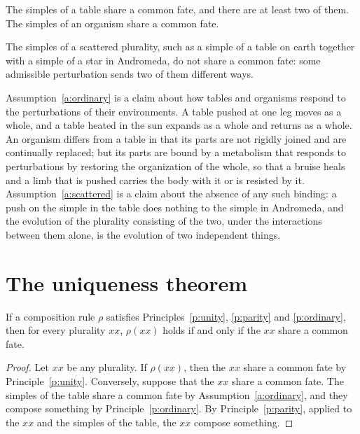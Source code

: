 \documentclass{situationist-preprint}
\begin{document}
\begin{assumption}\label{a:ordinary}
The simples of a table share a common fate, and there are at least two of them. The simples of an organism share a common fate.
\end{assumption}

\begin{assumption}\label{a:scattered}
The simples of a scattered plurality, such as a simple of a table on earth together with a simple of a star in Andromeda, do not share a common fate: some admissible perturbation sends two of them different ways.
\end{assumption}

Assumption~\ref{a:ordinary} is a claim about how tables and organisms respond to the perturbations of their environments. A table pushed at one leg moves as a whole, and a table heated in the sun expands as a whole and returns as a whole. An organism differs from a table in that its parts are not rigidly joined and are continually replaced; but its parts are bound by a metabolism that responds to perturbations by restoring the organization of the whole, so that a bruise heals and a limb that is pushed carries the body with it or is resisted by it. Assumption~\ref{a:scattered} is a claim about the absence of any such binding: a push on the simple in the table does nothing to the simple in Andromeda, and the evolution of the plurality consisting of the two, under the interactions between them alone, is the evolution of two independent things.

\section{The uniqueness theorem}

\begin{theorem}\label{t:unique}
If a composition rule $\rho$ satisfies Principles~\ref{p:unity}, \ref{p:parity} and \ref{p:ordinary}, then for every plurality $xx$, $\rho(xx)$ holds if and only if the $xx$ share a common fate.
\end{theorem}

\begin{proof}
Let $xx$ be any plurality. If $\rho(xx)$, then the $xx$ share a common fate by Principle~\ref{p:unity}. Conversely, suppose that the $xx$ share a common fate. The simples of the table share a common fate by Assumption~\ref{a:ordinary}, and they compose something by Principle~\ref{p:ordinary}. By Principle~\ref{p:parity}, applied to the $xx$ and the simples of the table, the $xx$ compose something.
\end{proof}
\end{document}
